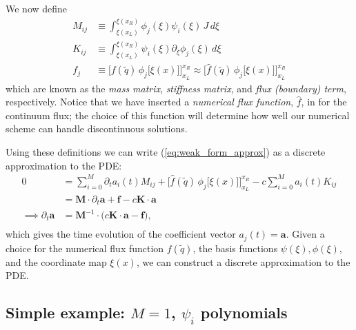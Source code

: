 \documentclass[12pt]{article}
\numberwithin{equation}{section}
\begin{document}
We now define
\begin{equation}
\begin{aligned}
M_{ij} &\equiv \int_{\xi(x_L)}^{\xi(x_R)} \phi_j(\xi) \psi_i(\xi) \, J \, d\xi \\
K_{ij} &\equiv \int_{\xi(x_L)}^{\xi(x_R)} \psi_i(\xi) \partial_\xi \phi_j(\xi) \, d \xi \\
f_j    &\equiv \Big[ f(\tilde{q}) \, \phi_j\big[ \xi(x) \big] \Big]^{x_R}_{x_L} \approx \Big[ \hat{f}(\tilde{q}) \, \phi_j\big[ \xi(x) \big] \Big]^{x_R}_{x_L}
\end{aligned}
\end{equation}
which are known as the \textit{mass matrix}, \textit{stiffness matrix}, and \textit{flux (boundary) term}, respectively. 
Notice that we have inserted a \textit{numerical flux function}, $\hat{f}$, in for the continuum flux; the choice of this function will determine how well our numerical scheme can handle discontinuous solutions.

Using these definitions we can write (\ref{eq:weak_form_approx}) as a discrete approximation to the PDE:
\begin{equation} \label{eq:discrete_approx}
\begin{aligned}
0 &= \sum_{i=0}^{M} \partial_t a_i(t) M_{ij} + \Big[ \hat{f}(\tilde{q}) \, \phi_j\big[ \xi(x) \big] \Big]^{x_R}_{x_L} - c \sum_{i=0}^{M} a_i(t) K_{ij} \\
&= \bm{M} \cdot \partial_t \bm{a} + \bm{f} - c \bm{K} \cdot \bm{a} \\
\implies \partial_t \bm{a} &= \bm{M}^{-1} \cdot \Big( c \bm{K} \cdot \bm{a} - \bm{f} \Big), \\
\end{aligned}
\end{equation}
which gives the time evolution of the coefficient vector $a_j(t) = \bm{a}$.
Given a choice for the numerical flux function $f(\tilde{q})$, the basis functions $\psi(\xi), \phi(\xi)$, and the coordinate map $\xi(x)$, we can construct a discrete approximation to the PDE.


\subsection{Simple example: $M=1$, $\psi_i$ polynomials}
\end{document}
